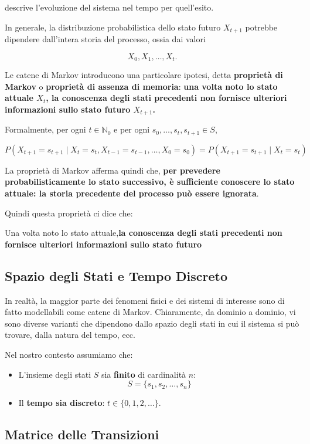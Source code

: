 descrive l'evoluzione del sistema nel tempo per quell'esito.

In generale, la distribuzione probabilistica dello stato futuro $X_{t+1}$ potrebbe dipendere dall'intera storia del processo, ossia dai valori

$$
X_0,X_1,\ldots,X_t.
$$

Le catene di Markov introducono una particolare ipotesi, detta \textbf{proprietà di Markov} o \textbf{proprietà di assenza di memoria}: \textbf{una volta noto lo stato attuale $X_t$, la conoscenza degli stati precedenti non fornisce ulteriori informazioni sullo stato futuro $X_{t+1}$.}

Formalmente, per ogni $t\in\mathbb{N}_0$ e per ogni $s_0,\ldots,s_t,s_{t+1}\in S$,

$$
\boxed{
P
\left(
X_{t+1}=s_{t+1}
\mid
X_t=s_t,X_{t-1}=s_{t-1},\ldots,X_0=s_0
\right)
=
P
\left(
X_{t+1}=s_{t+1}
\mid
X_t=s_t
\right)
}
$$

La proprietà di Markov afferma quindi che, \textbf{per prevedere probabilisticamente lo stato successivo, è sufficiente conoscere lo stato attuale: la storia precedente del processo può essere ignorata}.

Quindi questa proprietà ci dice che:
\begin{center}
    Una volta noto lo stato attuale,\textbf{la conoscenza degli stati precedenti non fornisce ulteriori informazioni sullo stato futuro}
\end{center}

\subsection{Spazio degli Stati e Tempo Discreto}

In realtà, la maggior parte dei fenomeni fisici e dei sistemi di interesse sono di fatto modellabili come catene di Markov. Chiaramente, da dominio a dominio, vi sono diverse varianti che dipendono dallo spazio degli stati in cui il sistema si può trovare, dalla natura del tempo, ecc.

Nel nostro contesto assumiamo che:
\begin{itemize}
    \item L'insieme degli stati $S$ sia \textbf{finito} di cardinalità $n$: 
    \[
    S = \{s_1, s_2, \dots, s_n\}
    \]
    \item Il \textbf{tempo sia discreto}: $t \in \{0, 1, 2, \dots\}$.
\end{itemize}

\subsection{Matrice delle Transizioni}

